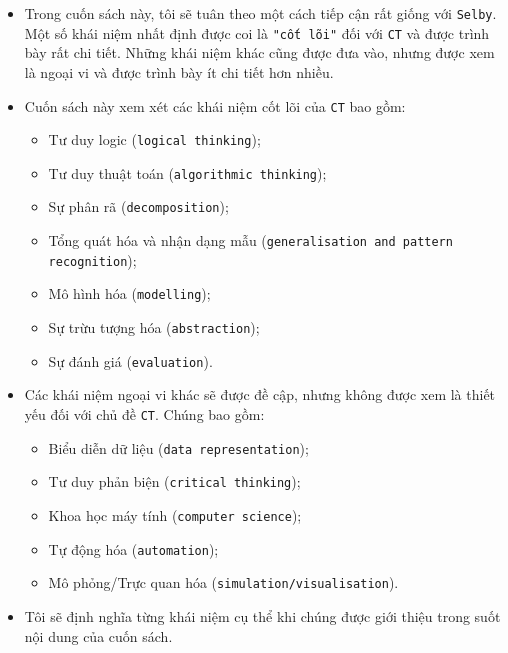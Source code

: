 \begin{itemize}
    \item Trong cuốn sách này, tôi sẽ tuân theo một cách tiếp cận rất giống với \texttt{Selby}. Một số khái niệm nhất định được coi là \verb|"cốt lõi"| đối với \texttt{CT} và được trình bày rất chi tiết. Những khái niệm khác cũng được đưa vào, nhưng được xem là ngoại vi và được trình bày ít chi tiết hơn nhiều.

    \item Cuốn sách này xem xét các khái niệm cốt lõi của \texttt{CT} bao gồm:
    \begin{itemize}
        \item Tư duy logic (\texttt{logical thinking});
        \item Tư duy thuật toán (\texttt{algorithmic thinking});
        \item Sự phân rã (\texttt{decomposition});
        \item Tổng quát hóa và nhận dạng mẫu (\texttt{generalisation and pattern recognition});
        \item Mô hình hóa (\texttt{modelling});
        \item Sự trừu tượng hóa (\texttt{abstraction});
        \item Sự đánh giá (\texttt{evaluation}).
    \end{itemize}

    \item Các khái niệm ngoại vi khác sẽ được đề cập, nhưng không được xem là thiết yếu đối với chủ đề \texttt{CT}. Chúng bao gồm:
    \begin{itemize}
        \item Biểu diễn dữ liệu (\texttt{data representation});
        \item Tư duy phản biện (\texttt{critical thinking});
        \item Khoa học máy tính (\texttt{computer science});
        \item Tự động hóa (\texttt{automation});
        \item Mô phỏng/Trực quan hóa (\texttt{simulation/visualisation}).
    \end{itemize}

    \item Tôi sẽ định nghĩa từng khái niệm cụ thể khi chúng được giới thiệu trong suốt nội dung của cuốn sách.
\end{itemize}

